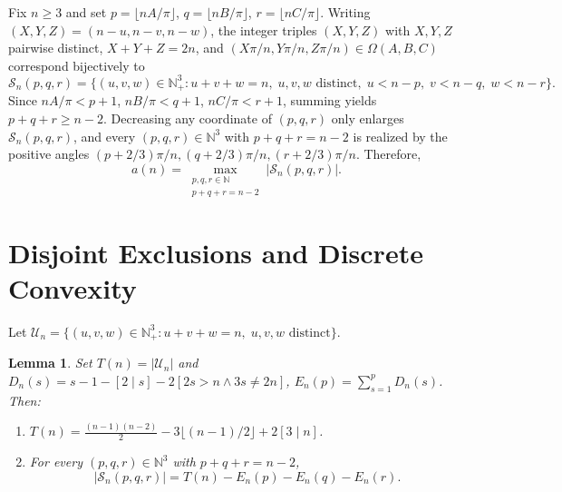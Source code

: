 \documentclass[11pt]{article}
\newtheorem{lemma}[theorem]{Lemma}
\begin{document}
Fix $n \ge 3$ and set $p = \lfloor nA/\pi \rfloor$, $q = \lfloor nB/\pi \rfloor$, $r = \lfloor nC/\pi \rfloor$. Writing $(X, Y, Z) = (n - u, n - v, n - w)$, the integer triples $(X, Y, Z)$ with $X, Y, Z$ pairwise distinct, $X + Y + Z = 2n$, and $(X\pi/n, Y\pi/n, Z\pi/n) \in \Omega(A, B, C)$ correspond bijectively to
\[
  \mathcal{S}_n(p, q, r) = \bigl\{(u, v, w) \in \mathbb{N}_+^3 : u + v + w = n,\; u, v, w \text{ distinct},\; u < n - p,\; v < n - q,\; w < n - r\bigr\}.
\]
Since $nA/\pi < p + 1$, $nB/\pi < q + 1$, $nC/\pi < r + 1$, summing yields $p + q + r \ge n - 2$. Decreasing any coordinate of $(p, q, r)$ only enlarges $\mathcal{S}_n(p, q, r)$, and every $(p, q, r) \in \mathbb{N}^3$ with $p + q + r = n - 2$ is realized by the positive angles $(p + 2/3)\pi/n, (q + 2/3)\pi/n, (r + 2/3)\pi/n$. Therefore,
\begin{equation}\label{eq:reduction}
  a(n) = \max_{\substack{p, q, r \in \mathbb{N} \\ p + q + r = n - 2}} |\mathcal{S}_n(p, q, r)|.
\end{equation}

\section{Disjoint Exclusions and Discrete Convexity}

Let $\mathcal{U}_n = \{(u, v, w) \in \mathbb{N}_+^3 : u + v + w = n,\; u, v, w \text{ distinct}\}$.

\begin{lemma}\label{lem:excl}
Set $T(n) = |\mathcal{U}_n|$ and $D_n(s) = s - 1 - [2 \mid s] - 2[2s > n \wedge 3s \ne 2n]$, $E_n(p) = \sum_{s=1}^p D_n(s)$. Then:
\begin{enumerate}
  \item $T(n) = \frac{(n - 1)(n - 2)}{2} - 3\lfloor (n - 1)/2 \rfloor + 2[3 \mid n]$.
  \item For every $(p, q, r) \in \mathbb{N}^3$ with $p + q + r = n - 2$,
  \[
    |\mathcal{S}_n(p, q, r)| = T(n) - E_n(p) - E_n(q) - E_n(r).
  \]
\end{enumerate}
\end{lemma}
\end{document}
